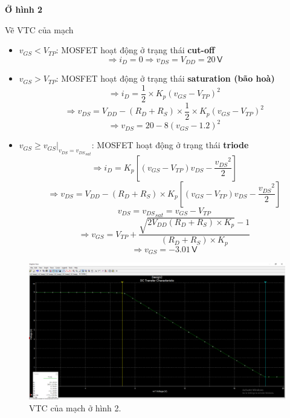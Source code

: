 \begin{center}
	\textbf{Ở hình 2}
\end{center}


\noindent Vẽ VTC của mạch

\begin{itemize}[label=-]
	\item $v_{GS}<V_{TP}$: MOSFET hoạt động ở trạng thái \textbf{cut-off}
	\[
	\Rightarrow i_{D}=0 \Rightarrow v_{DS}=V_{DD}=20\,\textsf{V}
	\]
	
	\item $v_{GS}>V_{TP}$: MOSFET hoạt động ở trạng thái \textbf{saturation (bão hoà)}
	\[
	\Rightarrow i_{D}=\frac{1}{2}\times K_{p}\left(v_{GS}-V_{TP}\right)^{2}
	\]
	\[
	\Rightarrow v_{DS}=V_{DD}-\left(R_{D}+R_{S}\right)\times\frac{1}{2}\times K_{p}\left(v_{GS}-V_{TP}\right)^{2}
	\]
	\[
	\Rightarrow v_{DS}=20-8\left(v_{GS}-1.2\right)^{2}
	\]
	
	\item $v_{GS}\geq \left.v_{GS}\right|_{v_{DS}={v_{DS}}_{sat}}$: MOSFET hoạt động ở trạng thái \textbf{triode}
	\[
	\Rightarrow i_{D}=K_{p}\left[\left(v_{GS}-V_{TP}\right)v_{DS}-\frac{{v_{DS}}^{2}}{2}\right]
	\]
	\[
	\Rightarrow v_{DS}=V_{DD}-\left(R_{D}+R_{S}\right)\times K_{p}\left[\left(v_{GS}-V_{TP}\right)v_{DS}-\frac{{v_{DS}}^{2}}{2}\right]
	\]
	\[
	v_{DS}={v_{DS}}_{sat}=v_{GS}-V_{TP}
	\]
	\[
	\Rightarrow v_{GS}=V_{TP}+\frac{\sqrt{2V_{DD}\left(R_{D}+R_{S}\right)\times K_{p}}-1}{\left(R_{D}+R_{S}\right)\times K_{p}}
	\]
	\[
	\Rightarrow v_{GS}=-3.01\,\textsf{V}
	\]
\end{itemize}

\begin{figure}[H]
	\centering
	\includegraphics[width=\linewidth]{./my-chapters/my-images/Question1/Câu 1 Hình 2 a - VTC.png}
	\caption{VTC của mạch ở hình 2.}
\end{figure}

